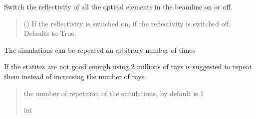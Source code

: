 \documentclass[letterpaper,10pt,english]{sphinxmanual}
\begin{document}
\begin{fulllineitems}
\begin{fulllineitems}
\label{\detokenize{API:raypyng.simulate.Simulate.reflectivity}}
\pysigstartsignatures
{}
\pysigstopsignatures
\sphinxAtStartPar
Switch the reflectivity of all the optical elements in the beamline on or off.
\begin{quote}\begin{description}
\sphinxAtStartPar
{} (\sphinxstyleliteralemphasis{\sphinxupquote{, }}) \textendash{} If  the reflectivity is switched on,
if  the reflectivity is switched off.
Defaults to True.

\end{description}\end{quote}

\end{fulllineitems}


\begin{fulllineitems}
\label{\detokenize{API:raypyng.simulate.Simulate.repeat}}
\pysigstartsignatures
{}
\pysigstopsignatures
\sphinxAtStartPar
The simulations can be repeated an arbitrary number of times

\sphinxAtStartPar
If the statitcs are not good enough using 2 millions of rays is suggested
to repeat them instead of increasing the number of rays
\begin{quote}\begin{description}
\sphinxAtStartPar
the number of repetition of the simulations, by default is 1

\sphinxAtStartPar
int

\end{description}\end{quote}

\end{fulllineitems}



\end{fulllineitems}
\end{document}
